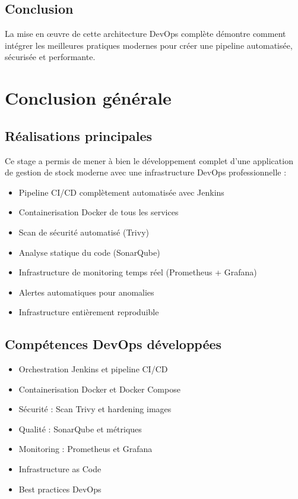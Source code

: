 \documentclass[12pt,a4paper]{report}
\begin{document}
\section{Conclusion}

La mise en œuvre de cette architecture DevOps complète démontre comment intégrer les meilleures pratiques modernes pour créer une pipeline automatisée, sécurisée et performante.

\newpage

\chapter*{Conclusion générale}

\section*{Réalisations principales}

Ce stage a permis de mener à bien le développement complet d'une application de gestion de stock moderne avec une infrastructure DevOps professionnelle :

\begin{itemize}
    \item Pipeline CI/CD complètement automatisée avec Jenkins
    \item Containerisation Docker de tous les services
    \item Scan de sécurité automatisé (Trivy)
    \item Analyse statique du code (SonarQube)
    \item Infrastructure de monitoring temps réel (Prometheus + Grafana)
    \item Alertes automatiques pour anomalies
    \item Infrastructure entièrement reproduible
\end{itemize}

\section*{Compétences DevOps développées}

\begin{itemize}
    \item Orchestration Jenkins et pipeline CI/CD
    \item Containerisation Docker et Docker Compose
    \item Sécurité : Scan Trivy et hardening images
    \item Qualité : SonarQube et métriques
    \item Monitoring : Prometheus et Grafana
    \item Infrastructure as Code
    \item Best practices DevOps
\end{itemize}
\end{document}
